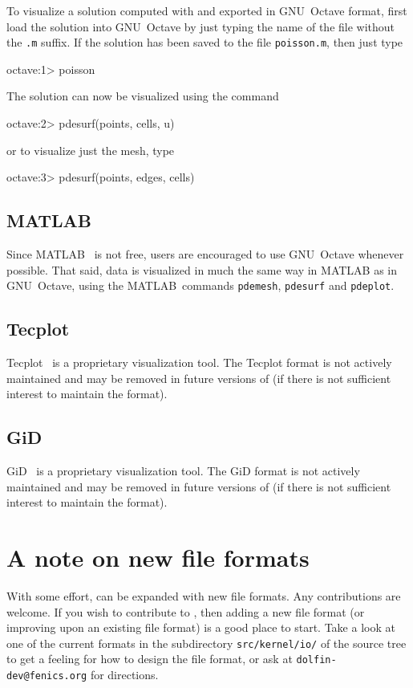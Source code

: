 To visualize a solution computed with \dolfin{} and exported in
GNU~Octave format, first load the solution into GNU~Octave by just
typing the name of the file without the \texttt{.m} suffix. If the
solution has been saved to the file \texttt{poisson.m}, then just type
\begin{code}
  octave:1> poisson
\end{code}
The solution can now be visualized using the command
\begin{code}
  octave:2> pdesurf(points, cells, u)
\end{code}
or to visualize just the mesh, type
\begin{code}
  octave:3> pdesurf(points, edges, cells)
\end{code}

\subsection{MATLAB}

Since MATLAB~\cite{www:MATLAB} is not free, users are encouraged to
use GNU~Octave whenever possible. That said, data is visualized in
much the same way in MATLAB as in GNU~Octave, using the
MATLAB~commands \texttt{pdemesh}, \texttt{pdesurf} and
\texttt{pdeplot}.

\subsection{Tecplot}

Tecplot~\cite{www:Tecplot} is a proprietary visualization tool.
The Tecplot format is not actively maintained and may be removed in
future versions of \dolfin{} (if there is not sufficient interest to
maintain the format).

\subsection{GiD}

GiD~\cite{www:GiD} is a proprietary visualization tool.
The GiD format is not actively maintained and may be removed in
future versions of \dolfin{} (if there is not sufficient interest to
maintain the format).

\section{A note on new file formats}

With some effort, \dolfin{} can be expanded with new file formats. Any
contributions are welcome. If you wish to contribute to \dolfin{},
then adding a new file format (or improving upon an existing file
format) is a good place to start. Take a look at one of the current
formats in the subdirectory \texttt{src/kernel/io/} of the \dolfin{}
source tree to get a feeling for how to design the file format, or ask
at \texttt{dolfin-dev@fenics.org} for directions.
